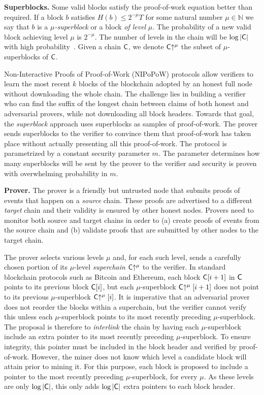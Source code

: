 \noindent
\textbf{Superblocks.}
Some valid blocks satisfy the proof-of-work equation better than required. If
a block $b$ satisfies $H(b) \leq 2^{-\mu} T$ for some natural number
$\mu \in \mathbb{N}$ we say that $b$ is a \emph{$\mu$-superblock} or a block
\emph{of level} $\mu$. The probability of a new valid block achieving level
$\mu$ is $2^{-\mu}$. The number of levels in the chain will be $\log|\mathsf{C}|$
with high probability~\cite{popow}. Given a chain $\mathsf{C}$, we denote
$\mathsf{C}\negthickspace\uparrow^\mu$ the subset of $\mu$-superblocks of $\mathsf{C}$.

Non-Interactive Proofs of Proof-of-Work (NIPoPoW) protocols allow verifiers to
learn the most recent $k$ blocks of the blockchain adopted by an honest full
node without downloading the whole chain. The challenge lies in building a
verifier who can find the suffix of the longest chain between claims of both
honest and adversarial provers, while not downloading all block headers. Towards
that goal, the \emph{superblock} approach uses superblocks as samples of
proof-of-work. The prover sends superblocks to the verifier to convince them
that proof-of-work has taken place without actually presenting all this
proof-of-work. The protocol is parametrized by a constant security parameter
$m$. The parameter determines how many superblocks will be sent by the prover to
the verifier and security is proven with overwhelming probability in $m$.

\noindent \textbf{Prover.} The prover is a friendly but untrusted node that
submits proofs of events that happen on a \emph{source} chain. These proofs are
advertised to a different \emph{target} chain and their validity is ensured by
other honest nodes. Provers need to monitor both source and target chains in
order to (a) create proofs of events from the source chain and (b) validate
proofs that are submitted by other nodes to the target chain.

The prover selects various levels $\mu$ and, for each
such level, sends a carefully chosen portion of its $\mu$-level
\emph{superchain} $\mathsf{C}\negthickspace\uparrow^\mu$ to the verifier. In standard blockchain
protocols such as Bitcoin and Ethereum, each block $\mathsf{C}[i + 1]$ in $\mathsf{C}$
points to its previous block $\mathsf{C}[i]$, but each $\mu$-superblock
$\mathsf{C}\negthickspace\uparrow^\mu[i + 1]$ does not point to its previous $\mu$-superblock
$\mathsf{C}\negthickspace\uparrow^\mu[i]$. It is imperative that an adversarial prover does not
reorder the blocks within a superchain, but the verifier cannot verify this
unless each $\mu$-superblock points to its most recently preceding
$\mu$-superblock. The proposal is therefore to \emph{interlink} the chain by
having each $\mu$-superblock include an extra pointer to its most recently
preceding $\mu$-superblock. To ensure integrity, this pointer must be included
in the block header and verified by proof-of-work. However, the miner does not
know which level a candidate block will attain prior to mining it. For this
purpose, each block is proposed to include a pointer to the most recently
preceding $\mu$-superblock, for every $\mu$.
As these levels are only $\log|\mathsf{C}|$, this only adds $\log|\mathsf{C}|$ extra
pointers to each block header.

